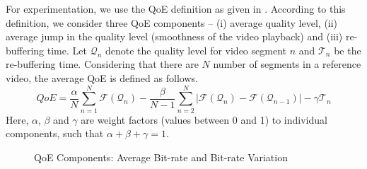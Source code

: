 For experimentation, we use the QoE definition as given in \cite{Pensieve}. According to this definition, we consider three QoE components -- (i) average quality level, (ii) average jump in the quality level (smoothness of the video playback) and (iii) re-buffering time. Let $\mathcal{Q}_n$ denote the quality level for video segment $n$ and $\mathcal{T}_n$ be the re-buffering time. Considering that there are $N$ number of segments in a reference video, the average QoE is defined as follows. 
\begin{equation}
QoE = \frac{\alpha}{N}\sum_{n=1}^{N} \mathcal{F}(\mathcal{Q}_n) - \frac{\beta}{N-1} \sum_{n=2}^{N}\lvert\mathcal{F}(\mathcal{Q}_n) -\mathcal{F}(\mathcal{Q}_{n-1})\rvert - \gamma\mathcal{T}_n
\label{eqn:QoE}
\end{equation}
Here, $\alpha$, $\beta$ and $\gamma$ are weight factors (values between 0 and 1) to individual components, such that $\alpha + \beta + \gamma = 1$. 
%
\begin{figure}[ht]
	\captionsetup[subfigure]{}
	\begin{center}
	\end{center}
	\caption{\label{fig:avgBitrate} QoE Components: Average Bit-rate and Bit-rate Variation}
\end{figure}
